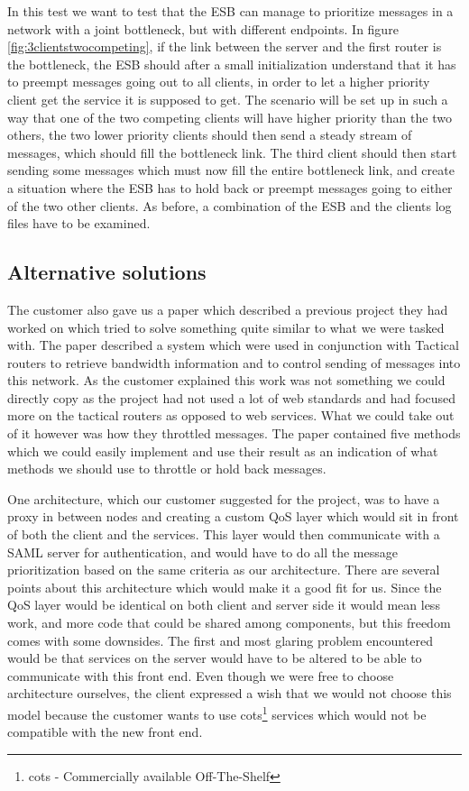     In this test we want to test that the ESB can manage to prioritize messages in a network with a joint bottleneck, but with different endpoints. In figure \ref{fig:3clientstwocompeting}, if the link between the server and the first router is the bottleneck, the ESB should after a small initialization understand that it has to preempt messages going out to all clients, in order to let a higher priority client get the service it is supposed to get. The scenario will be set up in such a way that one of the two competing clients will have higher priority than the two others, the two lower priority clients should then send a steady stream of messages, which should fill the bottleneck link. The third client should then start sending some messages which must now fill the entire bottleneck link, and create a situation where the ESB has to hold back or preempt messages going to either of the two other clients. As before, a combination of the ESB and the clients log files have to be examined.
           
    \subsection{Alternative solutions}\label{Alternative solutions}

        The customer also gave us a paper\cite{soa-qos-pdf} which described a previous project they had worked on which tried to solve something quite similar to what we were tasked with. The paper described a system which were used in conjunction with Tactical routers to retrieve bandwidth information and to control sending of messages into this network. As the customer explained this work was not something we could directly copy as the project had not used a lot of web standards and had focused more on the tactical routers as opposed to web services. What we could take out of it however was how they throttled messages. The paper contained five methods which we could easily implement and use their result as an indication of what methods we should use to throttle or hold back messages.

        One architecture, which our customer suggested for the project, was to have a proxy in between nodes and creating a custom QoS layer which would sit in front of both the client and the services. This layer would then communicate with a SAML server for authentication, and would have to do all the message prioritization based on the same criteria as our architecture. There are several points about this architecture which would make it a good fit for us. Since the QoS layer would be identical on both client and server side it would mean less work, and more code that could be shared among components, but this freedom comes with some downsides. The first and most glaring problem encountered would be that services on the server would have to be altered to be able to communicate with this front end. Even though we were free to choose architecture ourselves, the client expressed a wish that we would not choose this model because the customer wants to use \gls{cots}\footnote{\gls{cots} - Commercially available Off-The-Shelf} services which would not be compatible with the new front end.

